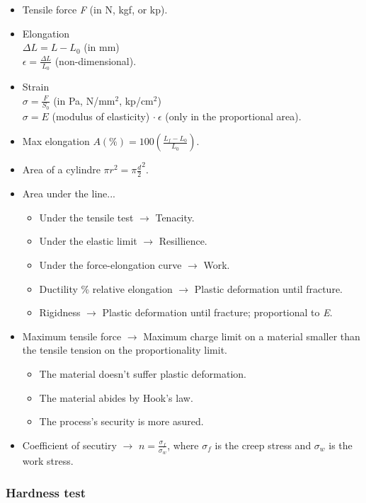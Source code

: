 \documentclass{article}
\begin{document}
\begin{itemize}
    \item Tensile force \emph{F} (in N, kgf, or kp).
    \item Elongation \\ $\Delta L = L - L_0$ (in mm) \\ $\epsilon =
    \frac{\Delta L}{L_0}$ (non-dimensional).
    \item Strain \\ $\sigma = \frac{F}{S_0}$ (in Pa, N/mm$^2$, kp/cm$^2$) \\
    $\sigma = E$ (modulus of elasticity) $\cdot \: \epsilon$ (only in the
    proportional area).
    \item Max elongation $A\left(\%\right) = 100
    \left(\frac{L_f - L_0}{L_0}\right)$.
    \item Area of a cylindre $\pi r^2 = \pi \frac{d}{2}^2$.
    \item Area under the line...
    \begin{itemize}
        \item Under the tensile test $\rightarrow$ Tenacity.
        \item Under the elastic limit $\rightarrow$ Resillience.
        \item Under the force-elongation curve $\rightarrow$ Work.
        \item Ductility \% relative elongation $\rightarrow$ Plastic deformation
        until fracture.
        \item Rigidness $\rightarrow$ Plastic deformation until fracture;
        proportional to \emph{E}.
    \end{itemize}
    \item Maximum tensile force $\rightarrow$ Maximum charge limit on a material
    smaller than the tensile tension on the proportionality limit.
    \begin{itemize}
        \item The material doesn't suffer plastic deformation.
        \item The material abides by Hook's law.
        \item The process's security is more asured.
    \end{itemize}
    \item Coefficient of secutiry $\rightarrow$ $n = \frac{\sigma_f}{\sigma_w}$,
    where $\sigma_f$ is the creep stress and $\sigma_w$ is the work stress.
\end{itemize}

\subsubsection*{Hardness test}
\end{document}

